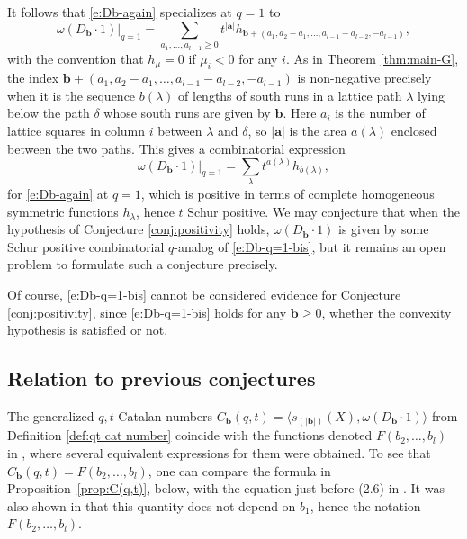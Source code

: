 \documentclass[12pt]{amsart}
\theoremstyle{definition}
\theoremstyle{remark}
\newcommand{\aA}{{\mathbf a}}
\newcommand{\bb}{{\mathbf b}}
\begin{document}
It follows that \eqref{e:Db-again} specializes at $q = 1$ to
\begin{equation}\label{e:Db-q=1}
\omega (D_{\bb }\cdot 1)|_{q=1} = \sum _{a_{1},\ldots,a_{l-1}\geq 0}
t^{|\aA |} h_{\bb
+(a_{1},a_{2}-a_{1},\ldots,a_{l-1}-a_{l-2},-a_{l-1})},
\end{equation}
with the convention that $h_{\mu } = 0$ if $\mu _{i}<0$ for any $i$.
As in Theorem \ref{thm:main-G}, the index $\bb
+(a_{1},a_{2}-a_{1},\ldots,a_{l-1}-a_{l-2},-a_{l-1})$ is non-negative
precisely when it is the sequence $b(\lambda )$ of lengths of south
runs in a lattice path $\lambda $ lying below the path $\delta $ whose
south runs are given by $\bb $.  Here $a_{i}$ is the number of lattice
squares in column $i$ between $\lambda $ and $\delta $, so $|\aA |$ is
the area $a(\lambda )$ enclosed between the two paths.  This gives a
combinatorial expression
\begin{equation}\label{e:Db-q=1-bis}
\omega (D_{\bb }\cdot 1)|_{q=1} = \sum _{\lambda } t^{a(\lambda )}
h_{b(\lambda )},
\end{equation}
for \eqref{e:Db-again} at $q=1$, which is positive in terms of
complete homogeneous symmetric functions $h_{\lambda }$, hence $t$
Schur positive.  We may conjecture that when the hypothesis of
Conjecture \ref{conj:positivity} holds, $\omega (D_{\bb }\cdot 1)$ is
given by some Schur positive combinatorial $q$-analog of
\eqref{e:Db-q=1-bis}, but it remains an open problem to formulate such
a conjecture precisely.

Of course, \eqref{e:Db-q=1-bis} cannot be considered evidence for
Conjecture \ref{conj:positivity}, since \eqref{e:Db-q=1-bis} holds for
any $\bb \geq 0$, whether the convexity hypothesis is satisfied or
not.

\subsection{Relation to previous conjectures}
\label{ss:Negut-conjecture}

The generalized $q,t$-Catalan numbers $C_\bb(q,t) = \langle
s_{(|\bb|)}(X), \omega (D_\bb \cdot 1) \rangle$ from Definition
\ref{def:qt cat number} coincide with the functions denoted
$F(b_2,\dots, b_l)$ in \cite{GHRS}, where several equivalent
expressions for them were obtained.  To see that $C_{\bb }(q,t) =
F(b_{2},\ldots,b_{l})$, one can compare the formula in
Proposition~\ref{prop:C(q,t)}, below, with the equation just before
(2.6) in \cite{GHRS}.  It was also shown in \cite{GHRS} that this
quantity does not depend on $b_{1}$, hence the notation $F(b_2,\dots,
b_l)$.
\end{document}

